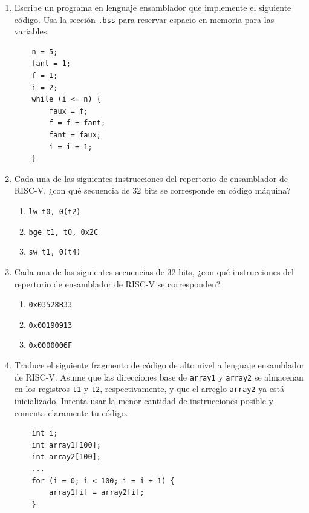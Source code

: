 \documentclass[letterpaper,12pt]{article}
\begin{document}
\begin{enumerate}
    \pagebreak

    \item Escribe un programa en lenguaje ensamblador que implemente el siguiente código. Usa la sección \texttt{.bss} para reservar espacio en memoria para las variables.
    \begin{verbatim}
    n = 5;
    fant = 1;
    f = 1;
    i = 2;
    while (i <= n) {
        faux = f;
        f = f + fant; 
        fant = faux; 
        i = i + 1;
    }
    \end{verbatim}

    \vspace{0.5cm}

    \item Cada una de las siguientes instrucciones del repertorio de ensamblador de RISC-V, ¿con qué secuencia de 32 bits se corresponde en código máquina?
    \begin{enumerate}[label=\alph*)]
        \item \texttt{lw t0, 0(t2)}
        \item \texttt{bge t1, t0, 0x2C}
        \item \texttt{sw t1, 0(t4)}
    \end{enumerate}

    \vspace{0.5cm}

    \item Cada una de las siguientes secuencias de 32 bits, ¿con qué instrucciones del repertorio de ensamblador de RISC-V se corresponden?
    \begin{enumerate}[label=\alph*)]
        \item \texttt{0x03528B33}
        \item \texttt{0x00190913}
        \item \texttt{0x0000006F}
    \end{enumerate}

    \vspace{0.5cm}
    \pagebreak

    \item Traduce el siguiente fragmento de código de alto nivel a lenguaje ensamblador de RISC-V. Asume que las direcciones base de \texttt{array1} y \texttt{array2} se almacenan en los registros \texttt{t1} y \texttt{t2}, respectivamente, y que el arreglo \texttt{array2} ya está inicializado. Intenta usar la menor cantidad de instrucciones posible y comenta claramente tu código.
    \begin{verbatim}
    int i;
    int array1[100];
    int array2[100];
    ...
    for (i = 0; i < 100; i = i + 1) {
        array1[i] = array2[i];
    }
    \end{verbatim}


\end{enumerate}
\end{document}
